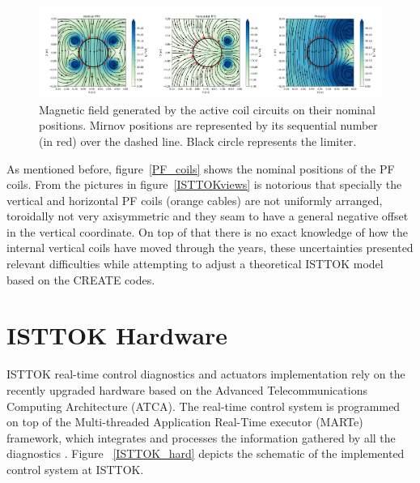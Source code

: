 \begin{figure}[htbp]
	\centering
	\includegraphics[width=1.12\textwidth]{Chp4/PF_fieldLines.png}
	\caption{ Magnetic field generated by the active coil circuits on their nominal positions. Mirnov positions are represented by its sequential number (in red) over the dashed line. Black circle represents the limiter.\label{PF_lines}  }
\end{figure}



As mentioned before, figure~\ref{PF_coils} shows the  nominal positions of the PF coils. From the pictures in figure~\ref{ISTTOKviews} is notorious that specially the vertical and horizontal PF coils (orange cables) are not uniformly arranged, toroidally not very axisymmetric and they seam to have a general negative offset in the vertical coordinate. On top of that there is no exact knowledge of how the internal vertical coils have moved through the years, these uncertainties presented relevant difficulties while   attempting to adjust a theoretical ISTTOK model based on the CREATE codes.\smallskip





\section{ISTTOK Hardware }

ISTTOK real-time control diagnostics and actuators  implementation rely  on the recently upgraded hardware based on the Advanced Telecommunications Computing Architecture (ATCA).   The real-time control system is programmed on top of the Multi-threaded Application Real-Time executor (MARTe) framework,  which  integrates and processes the information gathered by all the  diagnostics \cite{Ivo2}. Figure ~\ref{ISTTOK_hard} depicts the schematic of the implemented control system at ISTTOK.

